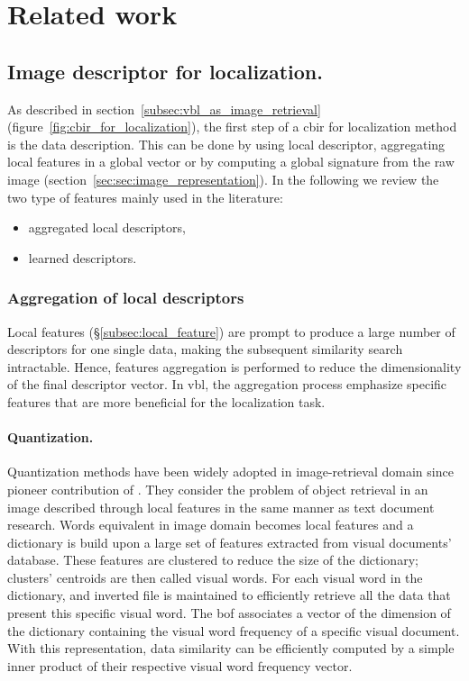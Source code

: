 \section{Related work}
\label{sec:cbir_data_for_loc}

\subsection{Image descriptor for localization.}

As described in section~\ref{subsec:vbl_as_image_retrieval} (figure~\ref{fig:cbir_for_localization}), the first step of a \ac{cbir} for localization method is the data description. This can be done by using local descriptor, aggregating local features in a global vector or by computing a global signature from the raw image (section~\ref{sec:sec:image_representation}). In the following we review the two type of features mainly used in the literature: 
\begin{itemize}
	\item aggregated local descriptors,
	\item learned descriptors.
\end{itemize}

\subsubsection{Aggregation of local descriptors}
\label{subsec:features_aggregation}
Local features (\S\ref{subsec:local_feature}) are prompt to produce a large number of descriptors for one single data, making the subsequent similarity search intractable. Hence, features aggregation is performed to reduce the dimensionality of the final descriptor vector. In \ac{vbl}, the aggregation process emphasize specific features that are more beneficial for the localization task.

\paragraph{Quantization.} Quantization methods have been widely adopted in image-retrieval domain since pioneer contribution of \citet{Sivic2003}. They consider the problem of object retrieval in an image described through local features in the same manner as text document research. Words equivalent in image domain becomes local features and a dictionary is build upon a large set of features extracted from visual documents' database. These features are clustered to reduce the size of the dictionary; clusters' centroids are then called visual words. For each visual word in the dictionary, and inverted file is maintained to efficiently retrieve all the data that present this specific visual word. The \ac{bof} associates a vector of the dimension of the dictionary containing the visual word frequency of a specific visual document. With this representation, data similarity can be efficiently computed by a simple inner product of their respective visual word frequency vector.

